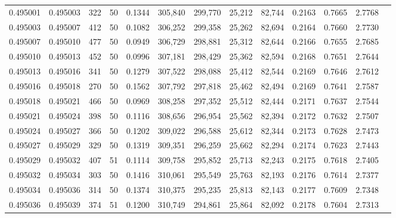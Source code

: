 \begin{tabular}{rrrrrrrrrrrrr}
0.495001 & 0.495003 &   322 &  50 &                                     0.1344 & 305,840 & 299,770 &  25,212 &  82,744 & 0.2163 & 0.7665 & 2.7768 \\
0.495003 & 0.495007 &   412 &  50 &                                     0.1082 & 306,252 & 299,358 &  25,262 &  82,694 & 0.2164 & 0.7660 & 2.7730 \\
0.495007 & 0.495010 &   477 &  50 &                                     0.0949 & 306,729 & 298,881 &  25,312 &  82,644 & 0.2166 & 0.7655 & 2.7685 \\
0.495010 & 0.495013 &   452 &  50 &                                     0.0996 & 307,181 & 298,429 &  25,362 &  82,594 & 0.2168 & 0.7651 & 2.7644 \\
0.495013 & 0.495016 &   341 &  50 &                                     0.1279 & 307,522 & 298,088 &  25,412 &  82,544 & 0.2169 & 0.7646 & 2.7612 \\
0.495016 & 0.495018 &   270 &  50 &                                     0.1562 & 307,792 & 297,818 &  25,462 &  82,494 & 0.2169 & 0.7641 & 2.7587 \\
0.495018 & 0.495021 &   466 &  50 &                                     0.0969 & 308,258 & 297,352 &  25,512 &  82,444 & 0.2171 & 0.7637 & 2.7544 \\
0.495021 & 0.495024 &   398 &  50 &                                     0.1116 & 308,656 & 296,954 &  25,562 &  82,394 & 0.2172 & 0.7632 & 2.7507 \\
0.495024 & 0.495027 &   366 &  50 &                                     0.1202 & 309,022 & 296,588 &  25,612 &  82,344 & 0.2173 & 0.7628 & 2.7473 \\
0.495027 & 0.495029 &   329 &  50 &                                     0.1319 & 309,351 & 296,259 &  25,662 &  82,294 & 0.2174 & 0.7623 & 2.7443 \\
0.495029 & 0.495032 &   407 &  51 &                                     0.1114 & 309,758 & 295,852 &  25,713 &  82,243 & 0.2175 & 0.7618 & 2.7405 \\
0.495032 & 0.495034 &   303 &  50 &                                     0.1416 & 310,061 & 295,549 &  25,763 &  82,193 & 0.2176 & 0.7614 & 2.7377 \\
0.495034 & 0.495036 &   314 &  50 &                                     0.1374 & 310,375 & 295,235 &  25,813 &  82,143 & 0.2177 & 0.7609 & 2.7348 \\
0.495036 & 0.495039 &   374 &  51 &                                     0.1200 & 310,749 & 294,861 &  25,864 &  82,092 & 0.2178 & 0.7604 & 2.7313 \\

\end{tabular}
